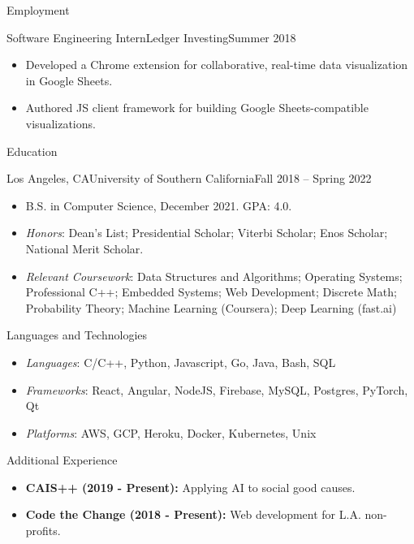 \documentclass[calibri]{mcdowellcv}
\begin{document}
\begin{cvsection}{Employment}
	\begin{cvsubsection}{Software Engineering Intern}{Ledger Investing}{Summer 2018}
		\begin{itemize}
			\item Developed a Chrome extension for collaborative, real-time data visualization in Google Sheets.
			\item Authored JS client framework for building Google Sheets-compatible visualizations.
		\end{itemize}
	\end{cvsubsection}
\end{cvsection}

\begin{cvsection}{Education}
	\begin{cvsubsection}{Los Angeles, CA}{University of Southern California}{Fall 2018 -- Spring 2022}
		\begin{itemize}
			\item B.S. in Computer Science, December 2021.  GPA: 4.0.
			\item \emph{Honors}: Dean's List; Presidential Scholar; Viterbi Scholar; Enos Scholar; National Merit Scholar.
			\item \emph{Relevant Coursework}: Data Structures and Algorithms; Operating Systems; Professional C++;
			Embedded Systems; Web Development; Discrete Math; Probability Theory; Machine Learning (Coursera);
			Deep Learning (fast.ai)
		\end{itemize}
	\end{cvsubsection}
\end{cvsection}

\begin{cvsection}{Languages and Technologies}
	\begin{cvsubsection}{}{}{}
		\begin{itemize}
			\item \emph{Languages}: C/C++, Python, Javascript, Go, Java, Bash, SQL
			\item \emph{Frameworks}: React, Angular, NodeJS, Firebase, MySQL, Postgres, PyTorch, Qt
			\item \emph{Platforms}: AWS, GCP, Heroku, Docker, Kubernetes, Unix
		\end{itemize}
	\end{cvsubsection}
\end{cvsection}

\begin{cvsection}{Additional Experience}
	\begin{cvsubsection}{}{}{}
		\begin{itemize}
			\item \textbf{CAIS++ (2019 - Present):} Applying AI to social good causes.
			\item \textbf{Code the Change (2018 - Present):} Web development for L.A. non-profits.
		\end{itemize}
	\end{cvsubsection}
\end{cvsection}
\end{document}

